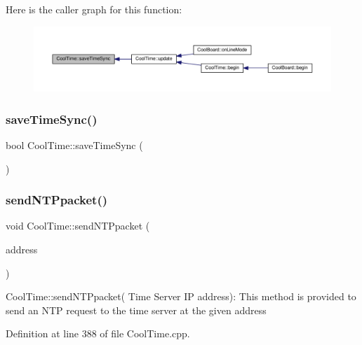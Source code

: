 Here is the caller graph for this function\+:
\nopagebreak
\begin{figure}[H]
\begin{center}
\leavevmode
\includegraphics[width=350pt]{classCoolTime_ae9658c9b377510d469e3b88edf33ee85_icgraph}
\end{center}
\end{figure}
\mbox{\label{classCoolTime_ae9658c9b377510d469e3b88edf33ee85}} 
\subsubsection{\texorpdfstring{save\+Time\+Sync()}{saveTimeSync()}\hspace{0.1cm}{\footnotesize\ttfamily [2/2]}}
{\footnotesize\ttfamily bool Cool\+Time\+::save\+Time\+Sync (\begin{DoxyParamCaption}{ }\end{DoxyParamCaption})}

\mbox{\label{classCoolTime_a236a38d120dc53bc67456d763838c5a1}} 
\subsubsection{\texorpdfstring{send\+N\+T\+Ppacket()}{sendNTPpacket()}}
{\footnotesize\ttfamily void Cool\+Time\+::send\+N\+T\+Ppacket (\begin{DoxyParamCaption}\item[{I\+P\+Address \&}]{address }\end{DoxyParamCaption})}

Cool\+Time\+::send\+N\+T\+Ppacket( Time Server I\+P address)\+: This method is provided to send an N\+TP request to the time server at the given address 

Definition at line 388 of file Cool\+Time.\+cpp.




